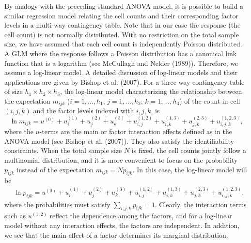 By analogy with the preceding standard ANOVA model, it is possible to build a
similar regression model relating the cell counts and their corresponding factor
levels in a multi-way contingency table. Note that in our case the response (the
cell count) is not normally distributed. With no restriction on the total sample
size, we have assumed that each cell count is independently Poisson distributed. A
GLM where the response follows a Poisson distribution has a canonical link function
that is a logarithm (see McCullagh and Nelder (1989)). Therefore, we assume a
log-linear model. A detailed discussion of log-linear models and their applications
are given by Bishop et al. (2007). For a three-way contingency table of size
$h_1\times h_2\times h_3$, the log-linear model characterizing the relationship
between the expectation $m_{ijk}$ ($i=1,\ldots,h_1$; $j=1,\ldots,h_2$;
$k=1,\ldots,h_3$) of the count in cell$(i,j,k)$ and the factor levels indexed with
$i,j,k$, is
\[
\ln m_{ijk}=u^{(0)}+u^{(1)}_i+u^{(2)}_j+u^{(3)}_k
+u^{(1,2)}_{i,j}+u^{(1,3)}_{i,k}+u^{(2,3)}_{j,k}+u^{(1,2,3)}_{i,j,k},
\]
where the $u$-terms are the main or factor interaction effects defined as in the
ANOVA model (see Bishop et al. (2007)). They also satisfy the identifiability
constraints. When the total sample size $N$ is fixed, the cell counts jointly follow
a multinomial distribution, and it is more convenient to focus on the probability
$p_{ijk}$ instead of the expectation $m_{ijk}=Np_{ijk}$. In this case, the
log-linear model will be
\begin{align}
&\ln p_{ijk}=u^{(0)}+u^{(1)}_i+u^{(2)}_j+u^{(3)}_k
+u^{(1,2)}_{i,j}+u^{(1,3)}_{i,k}+u^{(2,3)}_{j,k}+u^{(1,2,3)}_{i,j,k},\label{F2.1}
\end{align}
where the probabilities must satisfy $\sum_{i,j,k}p_{ijk}=1$. Clearly, the
interaction terms such as $u^{(1,2)}$ reflect the dependence among the factors, and
for a log-linear model without any interaction effects, the factors are independent.
In addition, we see that the main effect of a factor determines its marginal
distribution.

